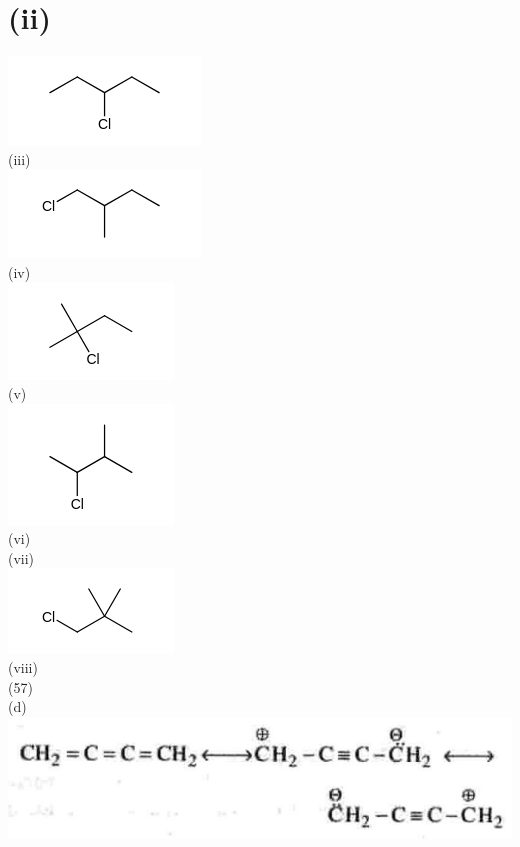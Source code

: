 \documentclass[10pt]{article}
\begin{document}
\section*{(ii)}
\includegraphics{smile-e7d59dbdc6f8a76a33d4639d8eeb16d1b3342e41}\\
(iii)\\
\includegraphics{smile-791ec9a4861b0a7d690bddce301772d9730d7e1b}\\
(iv)\\
\includegraphics{smile-edf7a5839c91a0005c39e8b51a3f2c33fbaa7f63}\\
(v)\\
\includegraphics{smile-fdf024c26119c5ba08f121ec53eac66e76d382b6}\\
(vi)\\
(vii)\\
\includegraphics{smile-f1efabd6885f76c58584a8b7417088cda71c2721}\\
(viii)\\
(57)\\
(d)\\
\includegraphics[max width=\textwidth, center]{2025_01_28_8470952b98110cec3aabg-159}\\
\end{document}
